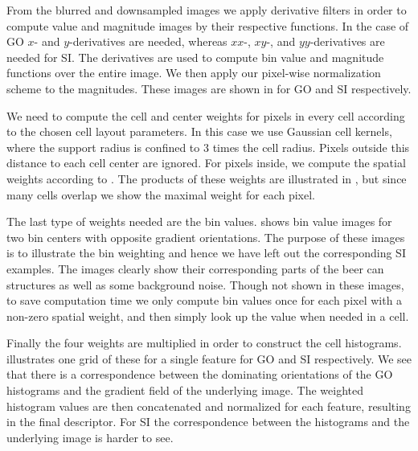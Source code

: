 \documentclass[thesis.tex]{subfiles}
\begin{document}
From the blurred and downsampled images we apply derivative filters in order to compute value and magnitude images by their respective functions. In the case of GO $x$- and $y$-derivatives are needed, whereas $xx$-, $xy$-, and $yy$-derivatives are needed for SI. The derivatives are used to compute bin value and magnitude functions over the entire image. We then apply our pixel-wise normalization scheme to the magnitudes. These images are shown in  for GO and SI respectively.

We need to compute the cell and center weights for pixels in every cell according to the chosen cell layout parameters. In this case we use Gaussian cell kernels, where the support radius is confined to $3$ times the cell radius. Pixels outside this distance to each cell center are ignored. For pixels inside, we compute the spatial weights according to . The products of these weights are illustrated in , but since many cells overlap we show the maximal weight for each pixel.

The last type of weights needed are the bin values.  shows bin value images for two bin centers with opposite gradient orientations. The purpose of these images is to illustrate the bin weighting and hence we have left out the corresponding SI examples. The images clearly show their corresponding parts of the beer can structures as well as some background noise. Though not shown in these images, to save computation time we only compute bin values once for each pixel with a non-zero spatial weight, and then simply look up the value when needed in a cell.


Finally the four weights are multiplied in order to construct the cell histograms.  illustrates one grid of these for a single feature for GO and SI respectively. We see that there is a correspondence between the dominating orientations of the GO histograms and the gradient field of the underlying image. The weighted histogram values are then concatenated and normalized for each feature, resulting in the final descriptor. For SI the correspondence between the histograms and the underlying image is harder to see.
\end{document}
